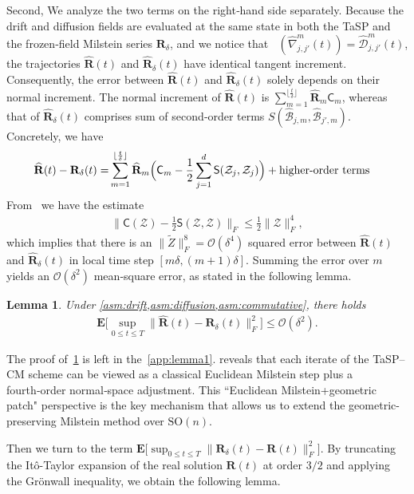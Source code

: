 \documentclass[11pt, a4paper, onecolumn]{article}
\newcommand{\SOn}{\mathrm{SO}(n)}
\renewcommand{\SS}{\mathsf{S}}
\newcommand{\bfE}{\bf{E}}
\newcommand{\m}{m}
\newcommand{\bfR}{\mathbf{R}}
\newcommand{\Z}{\mathcal{Z}}
\newcommand{\B}{\mathcal{B}}
\newcommand{\hatB}{\widehat{\B}}
\newcommand{\hatR}{\widehat{\bfR}}
\newcommand{\hatD}{\widehat{\tg D}}
\newcommand{\nmC}{\mathsf{C}}
\renewcommand{\bf}[1]{\mathbf{#1}}
\newcommand{\tg}[1]{\mathcal{#1}}
\newcommand{\calO}{\mathcal{O}}
\newcommand{\hBjms}{{\hatB_{j,\m}}}
\newcommand{\hBjpms}{{\hatB_{j',\m}}}
\newcommand{\hDjjpms}{ {\hatD_{j,j'}^{\m}} }
\newcommand{\hnjjpms}{ {\widehat{\nabla}_{j,j'}^{\m}} }
\newcommand{\sumub}{{\lfloor \frac{t}{\delta} \rfloor}}
\newcommand{\half}{{\frac{1}{2}}}
\DeclareMathOperator{\POtg}{\Pi^O_{T_{\bf R}}}
\newtheorem{lemma}{Lemma}
\begin{document}
Second, We analyze the two terms on the right‑hand side separately.  Because the drift and diffusion fields are evaluated at the same state in both the TaSP and the frozen‑field Milstein series $\bfR_\delta$, and we notice that $\POtg(\hnjjpms(t)) = \hDjjpms(t)$, the trajectories $\hatR(t)$ and $\hatR_\delta(t)$ have identical tangent increment. Consequently, the error between $\hatR(t)$ and $\hatR_\delta(t)$ solely depends on their normal increment. The normal increment of $\hatR(t)$ is $\sum_{m=1}^{\sumub} \hatR_{\m} \nmC_{\m}$, whereas that of $\hatR_\delta(t)$ comprises sum of second‑order terms $S(\hBjms, \hBjpms)$. Concretely, we have
\begin{align*}
     \hatR(t) - \bfR_\delta(t) = & \sum_{m=1}^{\sumub}  \hatR_{\m}\Bigl(\nmC_{\m} -   \half \sum_{j=1}^d \SS(\Z_j, \Z_j) \Bigr) +\text{higher-order terms}
\end{align*}
From~\cite{wang2025tangent} we have the estimate
\begin{align*}
\|\nmC(\Z)-\half\SS(\Z,\Z)\bigr\|_{F} \le \half\|\Z\|_F^{4},
\end{align*}
which implies that there is an $\|\tilde Z\|_F^{8}=\calO(\delta^{4})$ squared error between $\hatR(t)$ and $\hatR_\delta(t)$ in local time step $[m\delta,(m+1)\delta]$. Summing the error over $m$ yields an $\mathcal O(\delta^{2})$ mean‑square error, as stated in the following lemma.
\begin{lemma}\label{lemma:1} Under \cref{asm:drift,asm:diffusion,asm:commutative}, there holds
\begin{align*}
    \bfE\big[ \sup_{0 \le t\le T}\| \hatR(t)- \bfR_\delta(t) \|_F^2 \big] \le \calO(\delta^2).
\end{align*}
\end{lemma}
The proof of~\cref{lemma:1} is left in the~\cref{app:lemma1}.  reveals that each iterate of the TaSP–CM scheme can be viewed as a classical Euclidean Milstein step plus a fourth‑order normal‑space adjustment. This ``Euclidean Milstein+geometric patch" perspective is the key mechanism that allows us to extend the geometric-preserving Milstein method over $\SOn$.

Then we turn to the term $\bfE\big[ \sup_{0 \le t\le T} \|  \bfR_\delta(t) - \bfR(t)\|^2_F \big] $. By truncating the  It\^o-Taylor expansion of the real solution $\bfR(t)$ at order $3/2$ and applying the Gr\"onwall inequality, we obtain the following lemma.
\end{document}
